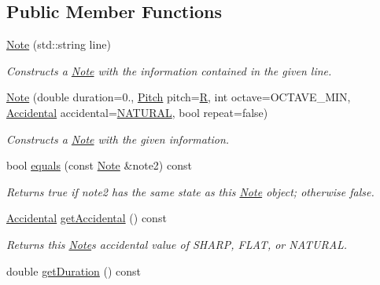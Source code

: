 \subsection*{Public Member Functions}
\begin{DoxyCompactItemize}
\item 
\mbox{\hyperlink{classNote_aa0709c7a84846e6ebcc352fad79d42ec}{Note}} (std\+::string line)
\begin{DoxyCompactList}\small\item\em Constructs a \mbox{\hyperlink{classNote}{Note}} with the information contained in the given line. \end{DoxyCompactList}\item 
\mbox{\hyperlink{classNote_af366baa02ddd569bde363d084da394c6}{Note}} (double duration=0., \mbox{\hyperlink{classNote_a6753778520a0d8493f6c18f6e6818542}{Pitch}} pitch=\mbox{\hyperlink{classNote_a6753778520a0d8493f6c18f6e6818542a1784b1a3d7cbd43c45ff82c72d05e4ae}{R}}, int octave=O\+C\+T\+A\+V\+E\+\_\+\+M\+IN, \mbox{\hyperlink{classNote_a48ac9ae5104f19cec526c22b5323f5d9}{Accidental}} accidental=\mbox{\hyperlink{classNote_a48ac9ae5104f19cec526c22b5323f5d9a0425aaf673bebee34014367ea7c3deb1}{N\+A\+T\+U\+R\+AL}}, bool repeat=false)
\begin{DoxyCompactList}\small\item\em Constructs a \mbox{\hyperlink{classNote}{Note}} with the given information. \end{DoxyCompactList}\item 
bool \mbox{\hyperlink{classNote_a517a407fe687980159376cf64c5a2775}{equals}} (const \mbox{\hyperlink{classNote}{Note}} \&note2) const
\begin{DoxyCompactList}\small\item\em Returns true if note2 has the same state as this \mbox{\hyperlink{classNote}{Note}} object; otherwise false. \end{DoxyCompactList}\item 
\mbox{\hyperlink{classNote_a48ac9ae5104f19cec526c22b5323f5d9}{Accidental}} \mbox{\hyperlink{classNote_a5794f20808fe07752a5b88972a5888ff}{get\+Accidental}} () const
\begin{DoxyCompactList}\small\item\em Returns this \mbox{\hyperlink{classNote}{Note}}\textquotesingle{}s accidental value of S\+H\+A\+RP, F\+L\+AT, or N\+A\+T\+U\+R\+AL. \end{DoxyCompactList}\item 
double \mbox{\hyperlink{classNote_a90398e9c86c5d1b9882f484bd9888dfd}{get\+Duration}} () const

\end{DoxyCompactItemize}
